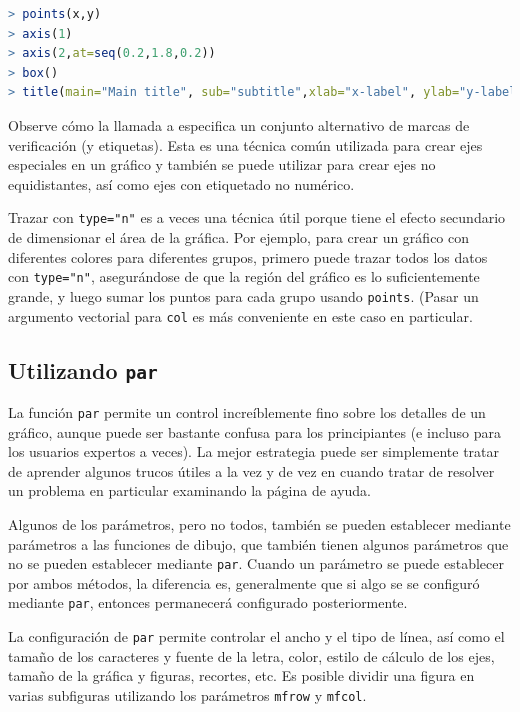 \begin{lstlisting}[language=R]
> points(x,y)
> axis(1)
> axis(2,at=seq(0.2,1.8,0.2))
> box()
> title(main="Main title", sub="subtitle",xlab="x-label", ylab="y-label")
\end{lstlisting}

Observe cómo la llamada a  especifica un conjunto alternativo de
marcas de verificación (y etiquetas). Esta es una técnica común utilizada para
crear ejes especiales en un gráfico y también se puede utilizar para crear ejes
no equidistantes, así como ejes con etiquetado no numérico.

Trazar con \texttt{type="n"} es a veces una técnica útil porque tiene el efecto
secundario de dimensionar el área de la gráfica. Por ejemplo, para crear un
gráfico con diferentes colores para diferentes grupos, primero puede trazar
todos los datos con \texttt{type="n"}, asegurándose de que la región del gráfico
es lo suficientemente grande, y luego sumar los puntos para cada grupo usando
\texttt{points}. (Pasar un argumento vectorial para \texttt{col} es más
conveniente en este caso en particular.

\subsection{Utilizando \texttt{par}}

La función \texttt{par} permite un control increíblemente fino sobre los
detalles de un gráfico, aunque puede ser bastante confusa para los principiantes
(e incluso para los usuarios expertos a veces). La mejor estrategia puede ser
simplemente tratar de aprender algunos trucos útiles a la vez y de vez en cuando
tratar de resolver un problema en particular examinando la página de ayuda.

Algunos de los parámetros, pero no todos, también se pueden establecer mediante
parámetros a las funciones de dibujo, que también tienen algunos parámetros que
no se pueden establecer mediante \texttt{par}.  Cuando un parámetro se puede
establecer por ambos métodos, la diferencia es, generalmente que si algo se se
configuró mediante \texttt{par}, entonces permanecerá configurado
posteriormente.

La configuración de \texttt{par} permite controlar el ancho y el tipo de línea,
así como el tamaño de los caracteres y fuente de la letra, color, estilo de
cálculo de los ejes, tamaño de la gráfica y figuras, recortes, etc. Es posible
dividir una figura en varias subfiguras utilizando los parámetros \texttt{mfrow}
y \texttt{mfcol}.

